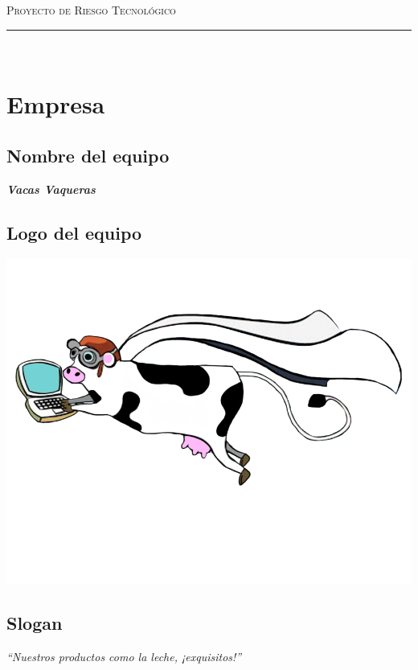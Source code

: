 \documentclass{article}
\begin{document}
\marginsize{2cm}{2cm}{1cm}{2cm} 

\begin{center}
  {\LARGE \scshape Proyecto de Riesgo Tecnológico\\\vspace{10mm} }
  \rule{0.8\textwidth}{.8pt}\\
\end{center}

\section*{Empresa}

\subsection*{Nombre del equipo} \textit{\textbf{Vacas Vaqueras}}
\subsection*{Logo del equipo}
\begin{center}
  \includegraphics[scale=.2]{../imagenes/logoo.png}
\end{center}
\subsection*{Slogan}
\begin{center}
  \textit{``Nuestros productos como la leche, ¡exquisitos!''}
\end{center}
\end{document}
